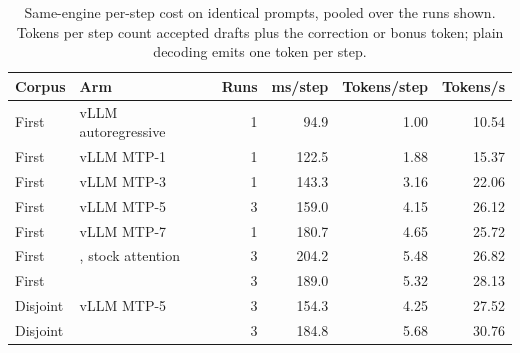 \begin{table}[t]
\caption{Same-engine per-step cost on identical prompts, pooled over the runs shown. Tokens per step count accepted drafts plus the correction or bonus token; plain decoding emits one token per step.}
\label{tab:per-step}
\centering\small
\setlength{\tabcolsep}{3.5pt}
\begin{tabular}{@{}llrrrr@{}}
\toprule
Corpus & Arm & Runs & ms/step & Tokens/step & Tokens/s \\
\midrule
First & vLLM autoregressive & 1 & 94.9 & 1.00 & 10.54 \\
First & vLLM MTP-1 & 1 & 122.5 & 1.88 & 15.37 \\
First & vLLM MTP-3 & 1 & 143.3 & 3.16 & 22.06 \\
First & vLLM MTP-5 & 3 & 159.0 & 4.15 & 26.12 \\
First & vLLM MTP-7 & 1 & 180.7 & 4.65 & 25.72 \\
First & \sys{}, stock attention & 3 & 204.2 & 5.48 & 26.82 \\
First & \sys{} & 3 & 189.0 & 5.32 & 28.13 \\
Disjoint & vLLM MTP-5 & 3 & 154.3 & 4.25 & 27.52 \\
Disjoint & \sys{} & 3 & 184.8 & 5.68 & 30.76 \\
\bottomrule
\end{tabular}
\end{table}
